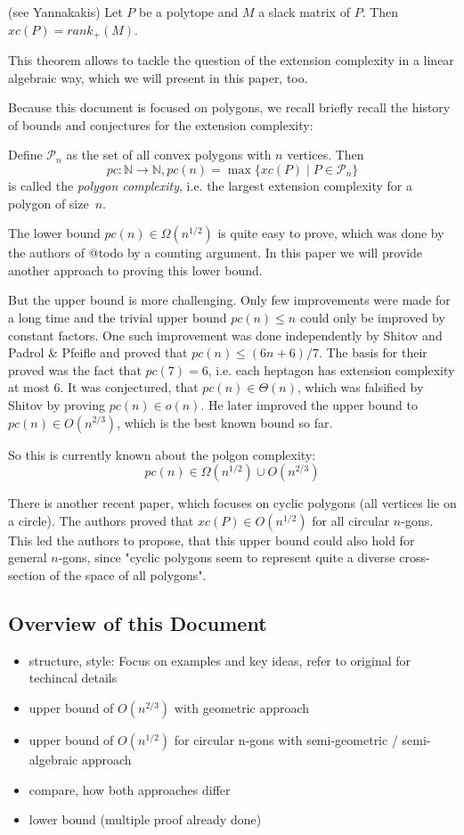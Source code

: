 \begin{theorem}(see Yannakakis)
  Let $P$ be a polytope and $M$ a slack matrix of $P$. Then $xc(P) = rank_+(M)$.
\end{theorem}

This theorem allows to tackle the question of the extension complexity in a linear algebraic way, which we will present in this paper, too.

Because this document is focused on polygons, we recall briefly recall the history of bounds and conjectures for the extension complexity:

Define $\mathcal{P}_n$ as the set of all convex polygons with $n$ vertices. Then $$pc:\mathbb{N} \to \mathbb{N}, pc(n) = \max \{xc(P) \mid P \in \mathcal{P}_n\}$$ is called the \textit{polygon complexity}, i.e. the largest extension complexity for a polygon of size~$n$.

The lower bound $pc(n) \in \Omega(n^{1/2})$ is quite easy to prove, which was done by the authors of @todo by a counting argument. In this paper we will provide another approach to proving this lower bound. 

But the upper bound is more challenging. Only few improvements were made for a long time and the trivial upper bound $pc(n) \leq n$ could only be improved by constant factors. One such improvement was done independently by Shitov and Padrol \& Pfeifle and proved that $pc(n) \leq (6n+6)/7$. The basis for their proved was the fact that $pc(7)=6$, i.e. each heptagon has extension complexity at most 6.
It was conjectured, that $pc(n) \in \Theta(n)$, which was falsified by Shitov by proving $pc(n) \in o(n)$. He later improved the upper bound to $pc(n) \in O(n^{2/3})$, which is the best known bound so far.

So this is currently known about the polgon complexity:
$$pc(n) \in \Omega(n^{1/2}) \cup O(n^{2/3})$$

There is another recent paper, which focuses on cyclic polygons (all vertices lie on a circle). The authors proved that $xc(P) \in O(n^{1/2})$ for all circular $n$-gons. 
This led the authors to propose, that this upper bound could also hold for general $n$-gons, since "cyclic polygons seem to represent quite a diverse cross-section of the space of all polygons".

\subsection{Overview of this Document}
\begin{itemize}
  \item structure, style: Focus on examples and key ideas, refer to original for techincal details
  \item upper bound of $O(n^{2/3})$ with geometric approach
  \item upper bound of $O(n^{1/2})$ for circular n-gons with semi-geometric / semi-algebraic approach
  \item compare, how both approaches differ
  \item lower bound (multiple proof already done)
\end{itemize}

